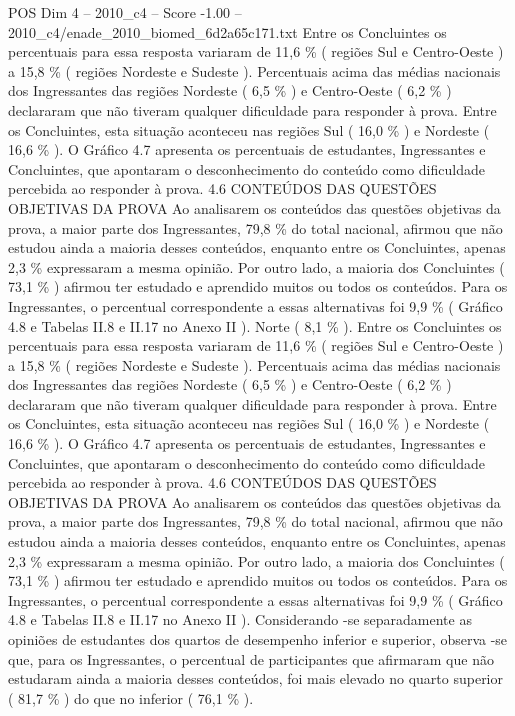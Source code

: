 \begin{textsample}{POS Dim 4 – 2010\_c4 – Score -1.00 – 2010\_c4/enade\_2010\_biomed\_6d2a65c171.txt}
Entre os Concluintes os percentuais para essa resposta variaram de 11,6 \% ( regiões Sul e Centro-Oeste ) a 15,8 \% ( regiões Nordeste e Sudeste ).
Percentuais acima das médias nacionais dos Ingressantes das regiões Nordeste ( 6,5 \% ) e Centro-Oeste ( 6,2 \% ) declararam que não tiveram qualquer dificuldade para responder à prova.
Entre os Concluintes, esta situação aconteceu nas regiões Sul ( 16,0 \% ) e Nordeste ( 16,6 \% ).
O Gráfico 4.7 apresenta os percentuais de estudantes, Ingressantes e Concluintes, que apontaram o desconhecimento do conteúdo como dificuldade percebida ao responder à prova. 4.6 CONTEÚDOS DAS QUESTÕES OBJETIVAS DA PROVA Ao analisarem os conteúdos das questões objetivas da prova, a maior parte dos Ingressantes, 79,8 \% do total nacional, afirmou que não estudou ainda a maioria desses conteúdos, enquanto entre os Concluintes, apenas 2,3 \% expressaram a mesma opinião.
Por outro lado, a maioria dos Concluintes ( 73,1 \% ) afirmou ter estudado e aprendido muitos ou todos os conteúdos.
Para os Ingressantes, o percentual correspondente a essas alternativas foi 9,9 \% ( Gráfico 4.8 e Tabelas II.8 e II.17 no Anexo II ).
Norte ( 8,1 \% ).
Entre os Concluintes os percentuais para essa resposta variaram de 11,6 \% ( regiões Sul e Centro-Oeste ) a 15,8 \% ( regiões Nordeste e Sudeste ).
Percentuais acima das médias nacionais dos Ingressantes das regiões Nordeste ( 6,5 \% ) e Centro-Oeste ( 6,2 \% ) declararam que não tiveram qualquer dificuldade para responder à prova.
Entre os Concluintes, esta situação aconteceu nas regiões Sul ( 16,0 \% ) e Nordeste ( 16,6 \% ).
O Gráfico 4.7 apresenta os percentuais de estudantes, Ingressantes e Concluintes, que apontaram o desconhecimento do conteúdo como dificuldade percebida ao responder à prova. 4.6 CONTEÚDOS DAS QUESTÕES OBJETIVAS DA PROVA Ao analisarem os conteúdos das questões objetivas da prova, a maior parte dos Ingressantes, 79,8 \% do total nacional, afirmou que não estudou ainda a maioria desses conteúdos, enquanto entre os Concluintes, apenas 2,3 \% expressaram a mesma opinião.
Por outro lado, a maioria dos Concluintes ( 73,1 \% ) afirmou ter estudado e aprendido muitos ou todos os conteúdos.
Para os Ingressantes, o percentual correspondente a essas alternativas foi 9,9 \% ( Gráfico 4.8 e Tabelas II.8 e II.17 no Anexo II ).
Considerando -se separadamente as opiniões de estudantes dos quartos de desempenho inferior e superior, observa -se que, para os Ingressantes, o percentual de participantes que afirmaram que não estudaram ainda a maioria desses conteúdos, foi mais elevado no quarto superior ( 81,7 \% ) do que no inferior ( 76,1 \% ).

\end{textsample}
